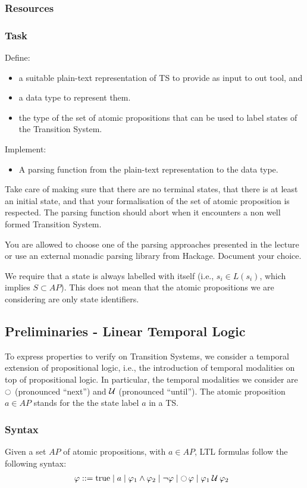\documentclass{article}
\begin{document}
\subsubsection*{Resources}
\cite[Paragraph 2.1]{BaKa}

\subsubsection*{Task}
Define:
\begin{itemize}
    \item a suitable plain-text representation of TS to provide as input to out tool, and
    \item a data type to represent them. 
    \item the type of the set of atomic propositions that can be used to label states of the Transition System.
\end{itemize}
Implement: 
\begin{itemize}
    \item A parsing function from the plain-text representation to the data type.
\end{itemize}
Take care of making sure that there are no terminal states, that there is at least an initial state, 
and that your formalisation of the set of atomic proposition is respected. The parsing function should 
abort when it encounters a non well formed Transition System.

You are allowed to choose one of the parsing approaches presented in the lecture or 
use an external monadic parsing library from Hackage. Document your choice.

We require that a state is always labelled with itself 
(i.e., $s_i \in L(s_i)$, which implies $S \subset AP$). This does not mean that the atomic propositions 
we are considering are only state identifiers.

\subsection{Preliminaries - Linear Temporal Logic}
To express properties to verify on Transition Systems, we consider a temporal extension of propositional logic, i.e., 
the introduction of temporal modalities on top of propositional logic. In particular, the temporal
modalities we consider are $\ocircle$ (pronounced ``next'') and $\mathbin{\mathcal{U}}$ (pronounced ``until'').
The atomic proposition $a \in AP$ stands for the the state label $a$ in a TS.

\subsubsection*{Syntax}
Given a set $AP$ of atomic propositions, with $a \in AP$, LTL formulas follow the following syntax: 
\begin{align*}
    &\; \varphi ::= \text{true} \mid a \mid \varphi_1 \land \varphi_2 \mid \neg \varphi \mid \mathop{\ocircle}{\varphi} \mid \varphi_1 \mathbin{\mathcal{U}} \varphi_2
\end{align*}
\end{document}

